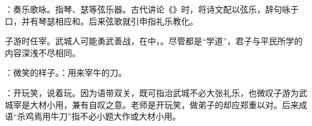 {
\item {}：奏乐歌咏。指琴、瑟等弦乐器。古代讲论《》时，将诗文配以弦乐，辞句咏于口，并有琴瑟相应和。后来弦歌就引申指礼乐教化。

子游时任宰。武城人可能勇武善战，在中，。尽管都是“学道”，君子与平民所学的内容深浅不尽相同。

\item {}：微笑的样子。：用来宰牛的刀。

\item {}：开玩笑，说着玩。因为语带双关，既可指治武城不必大张礼乐，也微叹子游为武城宰是大材小用，兼有自叹之意。老师是开玩笑，做弟子的却应郑重以对。后来成语“杀鸡焉用牛刀”指不必小题大作或大材小用。
}
{}


